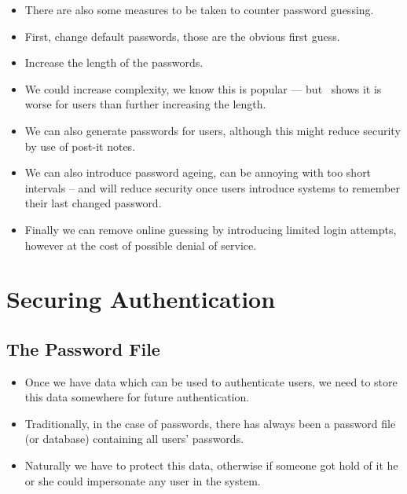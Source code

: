 \documentclass{beamer}
\begin{document}
\begin{frame}{\insertsubsectionhead}
  \begin{itemize}
    \item There are also some measures to be taken to counter password 
      guessing.

    \item First, change default passwords, those are the obvious first guess.

    \item Increase the length of the passwords.

    \item We could increase complexity, we know this is popular --- 
      but~\cite{Komanduri2011opa} shows it is worse for users than further 
      increasing the length.
  \end{itemize}
\end{frame}

\begin{frame}{\insertsubsectionhead}
  \begin{itemize}
    \item We can also generate passwords for users, although this might reduce 
      security by use of post-it notes.

    \item We can also introduce password ageing, can be annoying with too short 
      intervals -- and will reduce security once users introduce systems to 
      remember their last changed password.

    \item Finally we can remove online guessing by introducing limited login 
      attempts, however at the cost of possible denial of service.

  \end{itemize}
\end{frame}


\section[Securing]{Securing Authentication}

\subsection{The Password File}

\begin{frame}{\insertsubsectionhead}
  \begin{itemize}
    \item Once we have data which can be used to authenticate users, we need to 
      store this data somewhere for future authentication.

    \item Traditionally, in the case of passwords, there has always been a 
      password file (or database) containing all users' passwords.

    \item Naturally we have to protect this data, otherwise if someone got hold 
      of it he or she could impersonate any user in the system.

  \end{itemize}
\end{frame}
\end{document}
